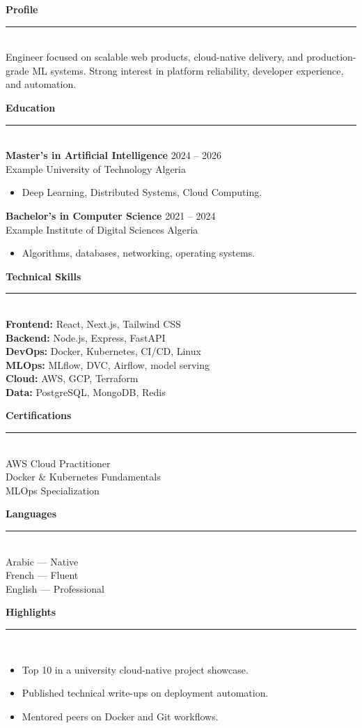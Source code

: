 \documentclass[10pt,a4paper]{article}
\newcommand{\sectiontitle}[1]{
  \vspace{0.55em}
  {\large\bfseries\color{ink}#1}\\[-0.15em]
  {\color{accent}\rule{2.4cm}{1pt}}\\[0.25em]
}
\newcommand{\entry}[4]{
  \textbf{#1} \hfill {\color{accentdark}\small #2}\\
  {\color{soft}#3} \hfill {\color{muted}\small #4}\\[-0.25em]
}
\begin{document}
\hfill
\begin{minipage}[t]{0.33\textwidth}
\sectiontitle{Profile}
{\color{soft}\small Engineer focused on scalable web products, cloud-native delivery, and production-grade ML systems. Strong interest in platform reliability, developer experience, and automation.}

\sectiontitle{Education}
\entry{Master's in Artificial Intelligence}{2024 -- 2026}{Example University of Technology}{Algeria}
\begin{itemize}
  \item Deep Learning, Distributed Systems, Cloud Computing.
\end{itemize}

\entry{Bachelor's in Computer Science}{2021 -- 2024}{Example Institute of Digital Sciences}{Algeria}
\begin{itemize}
  \item Algorithms, databases, networking, operating systems.
\end{itemize}

\sectiontitle{Technical Skills}
{\small
\textbf{Frontend:} React, Next.js, Tailwind CSS\\[0.25em]
\textbf{Backend:} Node.js, Express, FastAPI\\[0.25em]
\textbf{DevOps:} Docker, Kubernetes, CI/CD, Linux\\[0.25em]
\textbf{MLOps:} MLflow, DVC, Airflow, model serving\\[0.25em]
\textbf{Cloud:} AWS, GCP, Terraform\\[0.25em]
\textbf{Data:} PostgreSQL, MongoDB, Redis
}

\sectiontitle{Certifications}
{\small AWS Cloud Practitioner\\ Docker \& Kubernetes Fundamentals\\ MLOps Specialization}

\sectiontitle{Languages}
{\small Arabic — Native\\ French — Fluent\\ English — Professional}

\sectiontitle{Highlights}
\begin{itemize}
  \item Top 10 in a university cloud-native project showcase.
  \item Published technical write-ups on deployment automation.
  \item Mentored peers on Docker and Git workflows.
\end{itemize}

\end{minipage}
\end{document}

